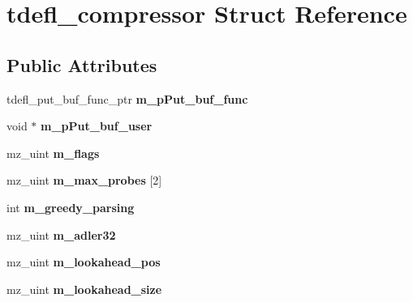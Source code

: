 \hypertarget{structtdefl__compressor}{}\section{tdefl\+\_\+compressor Struct Reference}
\label{structtdefl__compressor}
\subsection*{Public Attributes}
\begin{DoxyCompactItemize}
\item 
\mbox{\label{structtdefl__compressor_a744d78e0e02c77ff224a3a2eefc6c39f}} 
tdefl\+\_\+put\+\_\+buf\+\_\+func\+\_\+ptr {\bfseries m\+\_\+p\+Put\+\_\+buf\+\_\+func}
\item 
\mbox{\label{structtdefl__compressor_ad495682142ede0ea54a774a45a1e4145}} 
void $\ast$ {\bfseries m\+\_\+p\+Put\+\_\+buf\+\_\+user}
\item 
\mbox{\label{structtdefl__compressor_ac344aa36a4ec2cb54d39bea652994228}} 
mz\+\_\+uint {\bfseries m\+\_\+flags}
\item 
\mbox{\label{structtdefl__compressor_a019a2a421ee743e69dc0b3abdad00d67}} 
mz\+\_\+uint {\bfseries m\+\_\+max\+\_\+probes} \mbox{[}2\mbox{]}
\item 
\mbox{\label{structtdefl__compressor_acd97ca2c9c322def4d1873145f5c8e50}} 
int {\bfseries m\+\_\+greedy\+\_\+parsing}
\item 
\mbox{\label{structtdefl__compressor_aee1dafacfd0672f0940e391dcb26852f}} 
mz\+\_\+uint {\bfseries m\+\_\+adler32}
\item 
\mbox{\label{structtdefl__compressor_a40ff57dba8b2e99a4f6cd1a709138bfe}} 
mz\+\_\+uint {\bfseries m\+\_\+lookahead\+\_\+pos}
\item 
\mbox{\label{structtdefl__compressor_aad683845a1c4d4646819b9580f498f04}} 
mz\+\_\+uint {\bfseries m\+\_\+lookahead\+\_\+size}
\item 

\end{DoxyCompactItemize}
